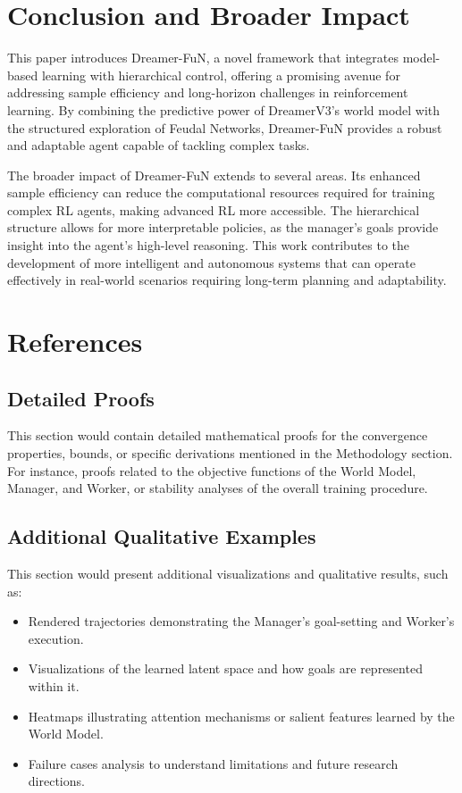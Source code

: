 \documentclass[conference]{IEEEtran}
\begin{document}
\section{Conclusion and Broader Impact}
This paper introduces Dreamer-FuN, a novel framework that integrates model-based learning with hierarchical control, offering a promising avenue for addressing sample efficiency and long-horizon challenges in reinforcement learning. By combining the predictive power of DreamerV3's world model with the structured exploration of Feudal Networks, Dreamer-FuN provides a robust and adaptable agent capable of tackling complex tasks.

The broader impact of Dreamer-FuN extends to several areas. Its enhanced sample efficiency can reduce the computational resources required for training complex RL agents, making advanced RL more accessible. The hierarchical structure allows for more interpretable policies, as the manager's goals provide insight into the agent's high-level reasoning. This work contributes to the development of more intelligent and autonomous systems that can operate effectively in real-world scenarios requiring long-term planning and adaptability.

\section*{References}



\appendix
\subsection{Detailed Proofs}
This section would contain detailed mathematical proofs for the convergence properties, bounds, or specific derivations mentioned in the Methodology section. For instance, proofs related to the objective functions of the World Model, Manager, and Worker, or stability analyses of the overall training procedure.

\subsection{Additional Qualitative Examples}
This section would present additional visualizations and qualitative results, such as:
\begin{itemize}
    \item Rendered trajectories demonstrating the Manager's goal-setting and Worker's execution.
    \item Visualizations of the learned latent space and how goals are represented within it.
    \item Heatmaps illustrating attention mechanisms or salient features learned by the World Model.
    \item Failure cases analysis to understand limitations and future research directions.
\end{itemize}
\end{document}
